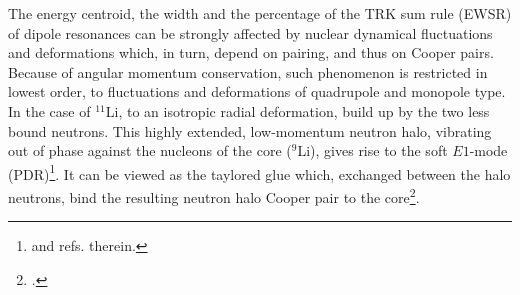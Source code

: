  The energy centroid, the width and the percentage of the TRK sum rule (EWSR) of dipole resonances can be strongly affected by nuclear dynamical fluctuations and deformations which, in turn, depend on pairing, and thus on Cooper pairs. Because of angular momentum conservation, such phenomenon is restricted in lowest order, to fluctuations and deformations of quadrupole and monopole type. In the case of $^{11}$Li, to an isotropic radial deformation, build up by the two less bound neutrons. This highly extended, low-momentum neutron halo, vibrating out of phase against the nucleons of the core ($^9$Li), gives rise to the soft $E1$-mode (PDR)\footnote{\cite{Broglia:19} and refs. therein.}.  It can be viewed as the taylored glue 
   which, exchanged between the halo neutrons, bind the resulting neutron halo Cooper pair to the core\footnote{\cite{Barranco:01}.}.


